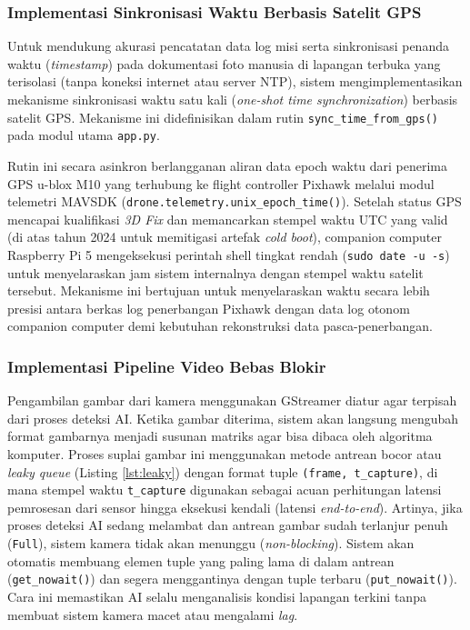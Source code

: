 \subsubsection{Implementasi Sinkronisasi Waktu Berbasis Satelit GPS}
Untuk mendukung akurasi pencatatan data log misi serta sinkronisasi penanda waktu (\textit{timestamp}) pada dokumentasi foto manusia di lapangan terbuka yang terisolasi (tanpa koneksi internet atau server NTP), sistem mengimplementasikan mekanisme sinkronisasi waktu satu kali (\textit{one-shot time synchronization}) berbasis satelit GPS. Mekanisme ini didefinisikan dalam rutin \texttt{sync\_time\_from\_gps()} pada modul utama \texttt{app.py}.

Rutin ini secara asinkron berlangganan aliran data epoch waktu dari penerima GPS u-blox M10 yang terhubung ke flight controller Pixhawk melalui modul telemetri MAVSDK (\texttt{drone.telemetry.unix\_epoch\_time()}). Setelah status GPS mencapai kualifikasi \textit{3D Fix} dan memancarkan stempel waktu UTC yang valid (di atas tahun 2024 untuk memitigasi artefak \textit{cold boot}), companion computer Raspberry Pi 5 mengeksekusi perintah shell tingkat rendah (\texttt{sudo date -u -s}) untuk menyelaraskan jam sistem internalnya dengan stempel waktu satelit tersebut. Mekanisme ini bertujuan untuk menyelaraskan waktu secara lebih presisi antara berkas log penerbangan Pixhawk dengan data log otonom companion computer demi kebutuhan rekonstruksi data pasca-penerbangan.

\subsubsection{Implementasi Pipeline Video Bebas Blokir}
Pengambilan gambar dari kamera menggunakan GStreamer diatur agar terpisah dari proses deteksi AI. Ketika gambar diterima, sistem akan langsung mengubah format gambarnya menjadi susunan matriks agar bisa dibaca oleh algoritma komputer. Proses suplai gambar ini menggunakan metode antrean bocor atau \textit{leaky queue} (Listing \ref{lst:leaky}) dengan format tuple \texttt{(frame, t\_capture)}, di mana stempel waktu \texttt{t\_capture} digunakan sebagai acuan perhitungan latensi pemrosesan dari sensor hingga eksekusi kendali (latensi \textit{end-to-end}). Artinya, jika proses deteksi AI sedang melambat dan antrean gambar sudah terlanjur penuh (\texttt{Full}), sistem kamera tidak akan menunggu (\textit{non-blocking}). Sistem akan otomatis membuang elemen tuple yang paling lama di dalam antrean (\texttt{get\_nowait()}) dan segera menggantinya dengan tuple terbaru (\texttt{put\_nowait()}). Cara ini memastikan AI selalu menganalisis kondisi lapangan terkini tanpa membuat sistem kamera macet atau mengalami \textit{lag}.

